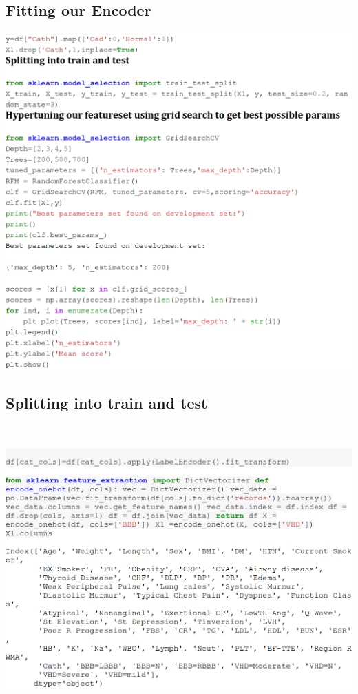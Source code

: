 \documentclass[sigconf]{acmart}
\begin{document}
\subsection{Fitting our Encoder}

\includegraphics[width=0.95\columnwidth]{images/Untitled5.png}

\subsection{Splitting into train and test}\

\includegraphics[width=0.95\columnwidth]{images/Untitled4.png}
\end{document}
